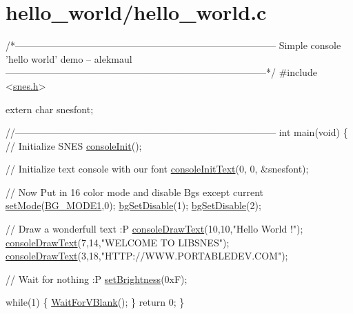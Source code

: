 \hypertarget{a00418}{}\section{hello\+\_\+world/hello\+\_\+world.\+c}

\begin{DoxyCodeInclude}
\textcolor{comment}{/*---------------------------------------------------------------------------------}
\textcolor{comment}{}
\textcolor{comment}{}
\textcolor{comment}{    Simple console 'hello world' demo}
\textcolor{comment}{    -- alekmaul}
\textcolor{comment}{}
\textcolor{comment}{}
\textcolor{comment}{---------------------------------------------------------------------------------*/}
\textcolor{preprocessor}{#include <\hyperlink{a00386}{snes.h}>}

\textcolor{keyword}{extern} \textcolor{keywordtype}{char} snesfont;

\textcolor{comment}{//---------------------------------------------------------------------------------}
\textcolor{keywordtype}{int} main(\textcolor{keywordtype}{void}) \{
    \textcolor{comment}{// Initialize SNES }
    \hyperlink{a00350_a6047713bb5a73afd3cd1d77e336bcdad}{consoleInit}();
    
    \textcolor{comment}{// Initialize text console with our font}
    \hyperlink{a00350_a458fa049800e12429ca0ba401e513746}{consoleInitText}(0, 0, &snesfont);

    \textcolor{comment}{// Now Put in 16 color mode and disable Bgs except current}
    \hyperlink{a00383_afd9e46ae627d055dd8c98a4b0ebb73b1}{setMode}(\hyperlink{a00347_a05c862edb7f8f75036f10c04dcc3c2a6}{BG\_MODE1},0);  \hyperlink{a00347_a4dbfb1b8854ff9ca4a7d11a899281bbb}{bgSetDisable}(1);  
      \hyperlink{a00347_a4dbfb1b8854ff9ca4a7d11a899281bbb}{bgSetDisable}(2);

    \textcolor{comment}{// Draw a wonderfull text :P}
    \hyperlink{a00350_a7e52d15b5a1befa42f5758de19dfb70c}{consoleDrawText}(10,10,\textcolor{stringliteral}{"Hello World !"});
    \hyperlink{a00350_a7e52d15b5a1befa42f5758de19dfb70c}{consoleDrawText}(7,14,\textcolor{stringliteral}{"WELCOME TO LIBSNES"});
    \hyperlink{a00350_a7e52d15b5a1befa42f5758de19dfb70c}{consoleDrawText}(3,18,\textcolor{stringliteral}{"HTTP://WWW.PORTABLEDEV.COM"});

    \textcolor{comment}{// Wait for nothing :P}
    \hyperlink{a00383_a4c257abebd75e4653441e8afe672bb5e}{setBrightness}(0xF);  
    
    \textcolor{keywordflow}{while}(1) \{
        \hyperlink{a00356_a815e2626bd26d0e936d507a363ecd723}{WaitForVBlank}();
    \}
    \textcolor{keywordflow}{return} 0;
\}
\end{DoxyCodeInclude}
 